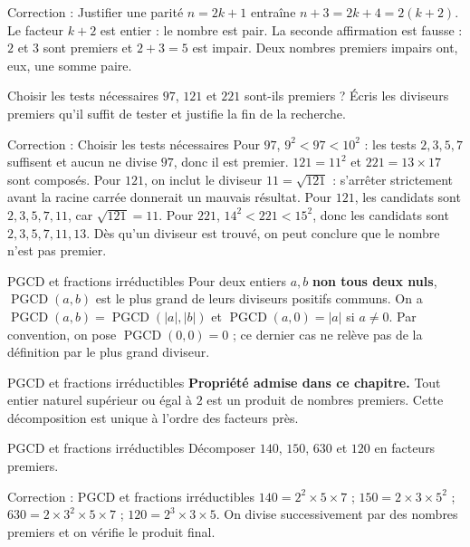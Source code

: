 \documentclass[aspectratio=169,10pt]{beamer}
\begin{document}
\begin{frame}{Correction : Justifier une parité}
\(n=2k+1\) entraîne \(n+3=2k+4=2(k+2)\). Le facteur \(k+2\) est entier : le nombre est pair. La seconde affirmation est fausse : \(2\) et \(3\) sont premiers et \(2+3=5\) est impair. Deux nombres premiers impairs ont, eux, une somme paire.
\end{frame}
\begin{frame}{Choisir les tests nécessaires}
\(97\), \(121\) et \(221\) sont-ils premiers ? Écris les diviseurs premiers qu’il suffit de tester et justifie la fin de la recherche.
\end{frame}
\begin{frame}{Correction : Choisir les tests nécessaires}
Pour \(97\), \(9^2<97<10^2\) : les tests \(2,3,5,7\) suffisent et aucun ne divise \(97\), donc il est premier. \(121=11^2\) et \(221=13\times17\) sont composés. Pour \(121\), on inclut le diviseur \(11=\sqrt{121}\) : s’arrêter strictement avant la racine carrée donnerait un mauvais résultat. Pour \(121\), les candidats sont \(2,3,5,7,11\), car \(\sqrt{121}=11\). Pour \(221\), \(14^2<221<15^2\), donc les candidats sont \(2,3,5,7,11,13\). Dès qu’un diviseur est trouvé, on peut conclure que le nombre n’est pas premier.
\end{frame}
\begin{frame}{PGCD et fractions irréductibles}
Pour deux entiers \(a,b\) \textbf{non tous deux nuls}, \(\operatorname{PGCD}(a,b)\) est le plus grand de leurs diviseurs positifs communs. On a \(\operatorname{PGCD}(a,b)=\operatorname{PGCD}(|a|,|b|)\) et \(\operatorname{PGCD}(a,0)=|a|\) si \(a\ne0\). Par convention, on pose \(\operatorname{PGCD}(0,0)=0\) ; ce dernier cas ne relève pas de la définition par le plus grand diviseur.
\end{frame}
\begin{frame}{PGCD et fractions irréductibles}
\textbf{Propriété admise dans ce chapitre.} Tout entier naturel supérieur ou égal à \(2\) est un produit de nombres premiers. Cette décomposition est unique à l'ordre des facteurs près.
\end{frame}
\begin{frame}{PGCD et fractions irréductibles}
Décomposer \(140\), \(150\), \(630\) et \(120\) en facteurs premiers.
\end{frame}
\begin{frame}{Correction : PGCD et fractions irréductibles}
\(140=2^2\times5\times7\) ; \(150=2\times3\times5^2\) ; \(630=2\times3^2\times5\times7\) ; \(120=2^3\times3\times5\). On divise successivement par des nombres premiers et on vérifie le produit final.
\end{frame}
\end{document}
